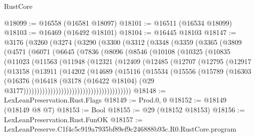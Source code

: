 \begin{lexlean}{RustCore}
\begin{coremodule}
@18099 := @16558 (@16581 @18097)
@18101 := @16511 (@16534 @18099)
@18103 := @16469 (@16492 @18101)
@18104 := @16445 @18103
@18147 := @3176
    (@3260
      (@3274
        (@3290
          (@3300
            (@3312
              (@3348
                (@3359
                  (@3365
                    (@3809
                      (@4571
                        (@6071
                          (@6645
                            (@7836
                              (@8096
                                (@8546
                                  (@10108
                                    (@10325
                                      (@10835
                                        (@11023
                                          (@11563
                                            (@11948
                                              (@12321
                                                (@12409
                                                  (@12485
                                                    (@12707
                                                      (@12795
                                                        (@12917
                                                          (@13158
                                                            (@13911
                                                              (@14202
                                                                (@14689
                                                                  (@15116
                                                                    (@15534
                                                                      (@15556
                                                                        (@15789
                                                                          (@16303
                                                                            (@16376
                                                                              (@16418
                                                                                (@3178
                                                                                  (@16422 @18104)
                                                                                  (@29
                                                                                    @3177))))))))))))))))))))))))))))))))))))))))
@18148 := LexLeanPreservation.Rust.Flags
@18149 := Prod.{0, 0}
@18152 := @18149 (@18149 @8 @7)
@18153 := Bool
@18155 := @29 (@18152 @18153)
@18156 := LexLeanPreservation.Rust.FunOK
@18157 := LexLeanPreserve.C1f4c5c919a7935bf89ef9c246888b93c.R0.RustCore.program

\end{coremodule}
\end{lexlean}
